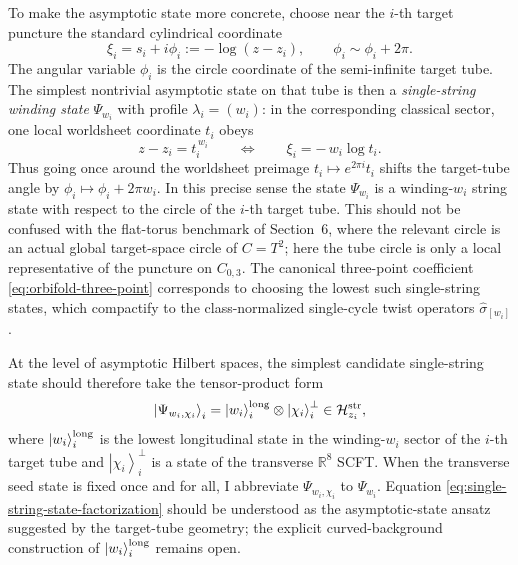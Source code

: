 \documentclass[11pt]{article}
\newcommand{\mc}[1]{\mathcal{#1}}
\newcommand{\bR}{\mathbb{R}}
\begin{document}
To make the asymptotic state more concrete, choose near the $i$-th target puncture the standard cylindrical coordinate
\begin{equation}\label{eq:target-tube-coordinate}
\xi_i=s_i+i\phi_i:=-\log(z-z_i),
\qquad
\phi_i\sim \phi_i+2\pi.
\end{equation}
The angular variable $\phi_i$ is the circle coordinate of the semi-infinite target tube. The simplest nontrivial asymptotic state on that tube is then a \emph{single-string winding state} $\Psi_{w_i}$ with profile $\lambda_i=(w_i)$: in the corresponding classical sector, one local worldsheet coordinate $t_i$ obeys
\begin{equation}\label{eq:single-string-tube-winding}
z-z_i=t_i^{\,w_i}
\qquad\Longleftrightarrow\qquad
\xi_i=-\,w_i\log t_i.
\end{equation}
Thus going once around the worldsheet preimage $t_i\mapsto e^{2\pi i}t_i$ shifts the target-tube angle by $\phi_i\mapsto \phi_i+2\pi w_i$. In this precise sense the state $\Psi_{w_i}$ is a winding-$w_i$ string state with respect to the circle of the $i$-th target tube. This should not be confused with the flat-torus benchmark of Section~6, where the relevant circle is an actual global target-space circle of $C=T^2$; here the tube circle is only a local representative of the puncture on $C_{0,3}$. The canonical three-point coefficient \eqref{eq:orbifold-three-point} corresponds to choosing the lowest such single-string states, which compactify to the class-normalized single-cycle twist operators $\widehat{\sigma}_{[w_i]}$.

At the level of asymptotic Hilbert spaces, the simplest candidate single-string state should therefore take the tensor-product form
\begin{equation}\label{eq:single-string-state-factorization}
\left|\Psi_{w_i,\chi_i}\right\rangle_i
=
\left|w_i\right\rangle_i^{\rm long}\otimes \left|\chi_i\right\rangle_i^\perp
\in
\mc H^{\rm str}_{z_i},
\end{equation}
where $\left|w_i\right\rangle_i^{\rm long}$ is the lowest longitudinal state in the winding-$w_i$ sector of the $i$-th target tube and $\left|\chi_i\right\rangle_i^\perp$ is a state of the transverse $\bR^8$ SCFT. When the transverse seed state is fixed once and for all, I abbreviate $\Psi_{w_i,\chi_i}$ to $\Psi_{w_i}$. Equation \eqref{eq:single-string-state-factorization} should be understood as the asymptotic-state ansatz suggested by the target-tube geometry; the explicit curved-background construction of $\left|w_i\right\rangle_i^{\rm long}$ remains open.
\end{document}

